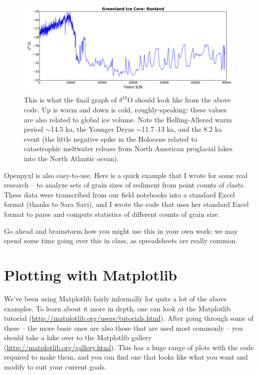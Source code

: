 \documentclass[a4paper,10pt]{scrartcl}
\begin{document}
\begin{figure}[!ht]
\begin{center}
\includegraphics[width=.9\linewidth]{figures/FilesData/GreenlandRenlandXLS.pdf}
\end{center}
\caption{This is what the final graph of $\delta^{18}$O should look like from the above code. Up is warm and down is cold, roughly-speaking: these values are also related to global ice volume. Note the Bølling-Allerød warm period $\sim$14.5 ka, the Younger Dryas $\sim$11.7--13 ka, and the 8.2 ka event (the little negative spike in the Holocene related to catastrophic meltwater release from North American proglacial lakes into the North Atlantic ocean).}
\end{figure}

Openpyxl is also easy-to-use. Here is a quick example that I wrote for some real research -- to analyze sets of grain sizes of sediment from point counts of clasts. These data were transcribed from our field notebooks into a standard Excel format (thanks to Sara Savi), and I wrote the code that uses her standard Excel format to parse and compute statistics of different counts of grain size.

Go ahead and brainstorm how you might use this in your own work; we may spend some time going over this in class, as spreadsheets are really common.



\section{Plotting with Matplotlib}

We've been using Matplotlib fairly informally for quite a lot of the above examples. To learn about it more in depth, one can look at the Matplotlib tutorial (\url{http://matplotlib.org/users/tutorials.html}). After going through some of these -- the more basic ones are also those that are used most commonly -- you should take a hike over to the Matplotlib gallery (\url{http://matplotlib.org/gallery.html}). This has a huge range of plots with the code required to make them, and you can find one that looks like what you want and modify to suit your current goals.
\end{document}

